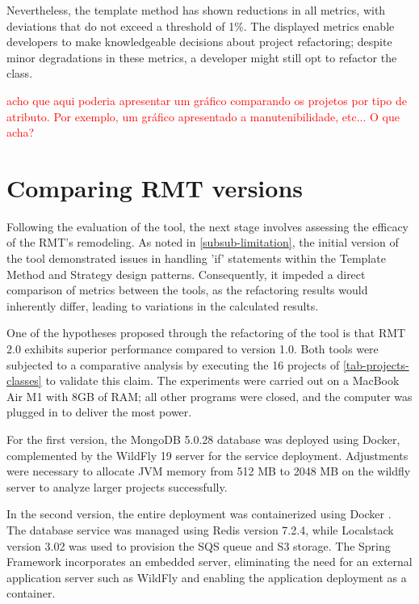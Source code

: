 Nevertheless, the template method has shown reductions in all metrics, with deviations that do not exceed a threshold of 1\%. The displayed metrics enable developers to make knowledgeable decisions about project refactoring; despite minor degradations in these metrics, a developer might still opt to refactor the class.

\textcolor{red}{acho que aqui poderia apresentar um gráfico comparando os projetos por tipo de atributo. Por exemplo, um gráfico apresentado a manutenibilidade, etc... O que acha?}



\section{Comparing RMT versions}
\label{sec-comparing}

Following the evaluation of the tool, the next stage involves assessing the efficacy of the RMT's remodeling. As noted in \cref{subsub-limitation}, the initial version of the tool demonstrated issues in handling 'if' statements within the Template Method and Strategy design patterns. Consequently, it impeded a direct comparison of metrics between the tools, as the refactoring results would inherently differ, leading to variations in the calculated results.

One of the hypotheses proposed through the refactoring of the tool is that RMT 2.0 exhibits superior performance compared to version 1.0. Both tools were subjected to a comparative analysis by executing the 16 projects of \cref{tab-projects-classes} to validate this claim. The experiments were carried out on a MacBook Air M1 with 8GB of RAM; all other programs were closed, and the computer was plugged in to deliver the most power.

For the first version, the MongoDB 5.0.28 \cite{mongo} database was deployed using Docker, complemented by the WildFly 19 \cite{wildfly} server for the service deployment. Adjustments were necessary to allocate JVM memory from 512 MB to 2048 MB on the wildfly server to analyze larger projects successfully.

In the second version, the entire deployment was containerized using Docker \cite{docker}. The database service was managed using Redis \cite{Redis} version 7.2.4, while Localstack \cite{localstack} version 3.02 was used to provision the SQS queue and S3 storage. The Spring Framework \cite{spring} incorporates an embedded server, eliminating the need for an external application server such as WildFly and enabling the application deployment as a container.

